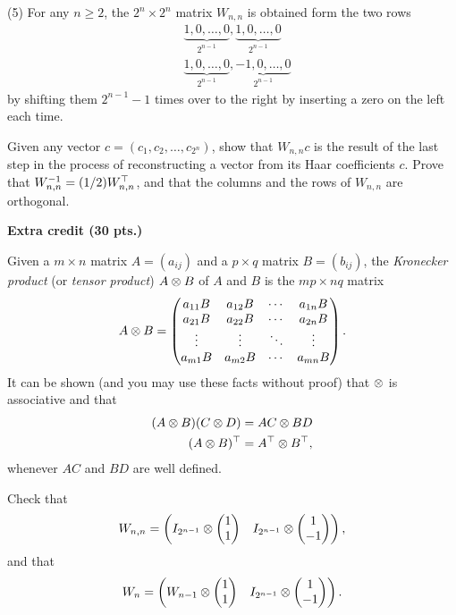 \documentclass[12pt]{article}
\begin{document}
\medskip
(5)
For any $n\geq 2$, the $2^n \times 2^n$ matrix $W_{n, n}$ is obtained form the
two rows
\begin{align*}
& \underbrace{1, 0, \ldots, 0}_{2^{n - 1}}, \underbrace{1, 0, \ldots,  0}_{2^{n - 1}} \\
& \underbrace{1, 0, \ldots, 0}_{2^{n - 1}}, \underbrace{-1, 0, \ldots,  0}_{2^{n - 1}} 
\end{align*}
by shifting them $2^{n - 1} - 1$ times over to the right by inserting a zero
on the left each time.

\medskip
Given any vector $c = (c_1, c_2, \ldots, c_{2^n})$, show that $W_{n, n} c$
is the result of the last step in  the
process of reconstructing a vector from its Haar coefficients $c$.
Prove that $W_{n, n}^{-1} = (1/2)W_{n, n}^{\top}$, and that the
columns and the rows
of $W_{n, n}$ are orthogonal.


\medskip
{\bf Extra credit (30 pts.)}

\medskip
Given a $m\times n$ matrix $A = (a_{i j})$ and a $p\times q$ matrix
$B = (b_{i j})$, the {\it Kronecker product\/} (or {\it tensor
  product\/}) $A\otimes B$ of $A$ and $B$ is the $mp\times nq$ matrix
\[
A\otimes B =
\begin{pmatrix}
a_{1 1} B & a_{1 2} B & \cdots & a_{1 n} B \\
a_{2 1} B & a_{2 2} B & \cdots & a_{2 n} B \\
\vdots  & \vdots & \ddots & \vdots \\
a_{m 1} B & a_{m 2} B & \cdots & a_{m n} B 
\end{pmatrix} .
\]
It can be shown (and you may use these facts without proof) that
$\otimes$ is associative and that
\begin{align*}
(A\otimes B)(C\otimes D) & = AC \otimes BD \\
(A\otimes B)^{\top} & = A^{\top} \otimes B^{\top}, 
\end{align*}
whenever $AC$ and $BD$ are well defined.

\medskip
Check that
\[
W_{n, n} =
\begin{pmatrix}
I_{2^{n-1}} \otimes 
\begin{pmatrix}
1 \\
1
\end{pmatrix}
& 
I_{2^{n-1}} \otimes 
\begin{pmatrix}
1 \\
-1
\end{pmatrix}
\end{pmatrix} ,
\]
and that
\[
W_{n} =
\begin{pmatrix}
W_{n-1} \otimes 
\begin{pmatrix}
1 \\
1
\end{pmatrix}
& 
I_{2^{n-1}} \otimes 
\begin{pmatrix}
1 \\
-1
\end{pmatrix}
\end{pmatrix} .
\]
\end{document}
